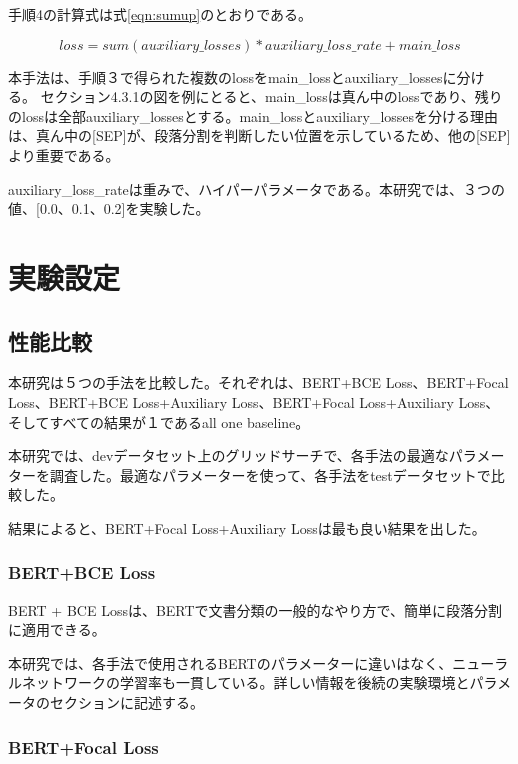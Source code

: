 \documentclass[
  platex, dvipdfmx,  %
]{nlp2021}
\begin{document}
手順4の計算式は式\ref{eqn:sumup}のとおりである。

\begin{equation}
  \label{eqn:sumup}
  loss = sum(auxiliary\_losses) * auxiliary\_loss\_rate + main\_loss
\end{equation}

本手法は、手順３で得られた複数のlossをmain\_lossとauxiliary\_lossesに分ける。 セクション4.3.1の図を例にとると、main\_lossは真ん中のlossであり、残りのlossは全部auxiliary\_lossesとする。main\_lossとauxiliary\_lossesを分ける理由は、真ん中の[SEP]が、段落分割を判断したい位置を示しているため、他の[SEP]より重要である。

auxiliary\_loss\_rateは重みで、ハイパーパラメータである。本研究では、３つの値、[0.0、0.1、0.2]を実験した。

\section{実験設定}

\subsection{性能比較}

本研究は５つの手法を比較した。それぞれは、BERT+BCE Loss、BERT+Focal Loss、BERT+BCE Loss+Auxiliary Loss、BERT+Focal Loss+Auxiliary Loss、そしてすべての結果が１であるall one baseline。

本研究では、devデータセット上のグリッドサーチで、各手法の最適なパラメーターを調査した。最適なパラメーターを使って、各手法をtestデータセットで比較した。

結果によると、BERT+Focal Loss+Auxiliary Lossは最も良い結果を出した。

\subsubsection{BERT+BCE Loss}

BERT + BCE Lossは、BERTで文書分類の一般的なやり方で、簡単に段落分割に適用できる。

本研究では、各手法で使用されるBERTのパラメーターに違いはなく、ニューラルネットワークの学習率も一貫している。詳しい情報を後続の実験環境とパラメータのセクションに記述する。

\subsubsection{BERT+Focal Loss}
\end{document}
